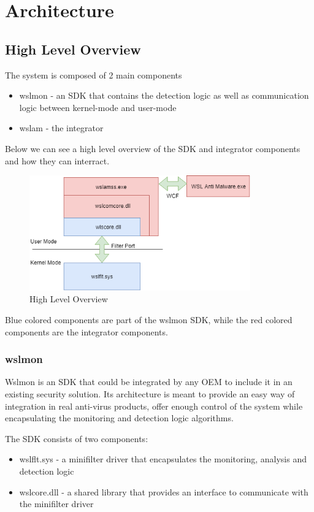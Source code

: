 \chapter{Architecture}
    \section{High Level Overview}
        The system is composed of 2 main components
        \begin{itemize}
            \item wslmon - an SDK that contains the detection logic as well as communication logic between kernel-mode and user-mode
            \item wslam - the integrator
        \end{itemize}

        Below we can see a high level overview of the SDK and integrator components and how they can interract.
        
        \begin{figure}[H]
            \includegraphics[width=360px, keepaspectratio]{img/high_level_overview_diagram.png}
            \caption{High Level Overview}
            \label{fig:high_level_overview_diagram}
        \end{figure}

        Blue colored components are part of the wslmon SDK, while the red colored components are the integrator components.
    
    \subsection{wslmon}
        Wslmon is an SDK that could be integrated by any OEM to include it in an existing security solution. Its
        architecture is meant to provide an easy way of integration in real anti-virus products, offer enough control of the system while
        encapsulating the monitoring and detection logic algorithms.

        The SDK consists of two components:
        \begin{itemize}
            \item wslflt.sys - a minifilter driver that encapsulates the monitoring, analysis and detection logic
            \item wslcore.dll - a shared library that provides an interface to communicate with the minifilter driver
        \end{itemize}

